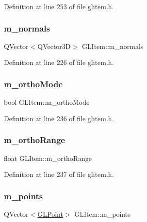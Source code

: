 Definition at line 253 of file glitem.\+h.

\mbox{\label{class_g_l_item_ab36af5032ab015c92a55fbed02c40c4d}} 
\subsubsection{\texorpdfstring{m\_normals}{m\_normals}}
{\footnotesize\ttfamily Q\+Vector$<$Q\+Vector3D$>$ G\+L\+Item\+::m\+\_\+normals\hspace{0.3cm}{\ttfamily [protected]}}



Definition at line 226 of file glitem.\+h.

\mbox{\label{class_g_l_item_a7ff6af05a375bac0cc2cc9333595de43}} 
\subsubsection{\texorpdfstring{m\_orthoMode}{m\_orthoMode}}
{\footnotesize\ttfamily bool G\+L\+Item\+::m\+\_\+ortho\+Mode\hspace{0.3cm}{\ttfamily [protected]}}



Definition at line 236 of file glitem.\+h.

\mbox{\label{class_g_l_item_a9829d649c448ca4a92b5ccac08d51d68}} 
\subsubsection{\texorpdfstring{m\_orthoRange}{m\_orthoRange}}
{\footnotesize\ttfamily float G\+L\+Item\+::m\+\_\+ortho\+Range\hspace{0.3cm}{\ttfamily [protected]}}



Definition at line 237 of file glitem.\+h.

\mbox{\label{class_g_l_item_a52bdba33d8c29f43ed5506035fbcaa81}} 
\subsubsection{\texorpdfstring{m\_points}{m\_points}}
{\footnotesize\ttfamily Q\+Vector$<$\mbox{\hyperlink{class_g_l_point}{G\+L\+Point}}$>$ G\+L\+Item\+::m\+\_\+points\hspace{0.3cm}{\ttfamily [protected]}}




